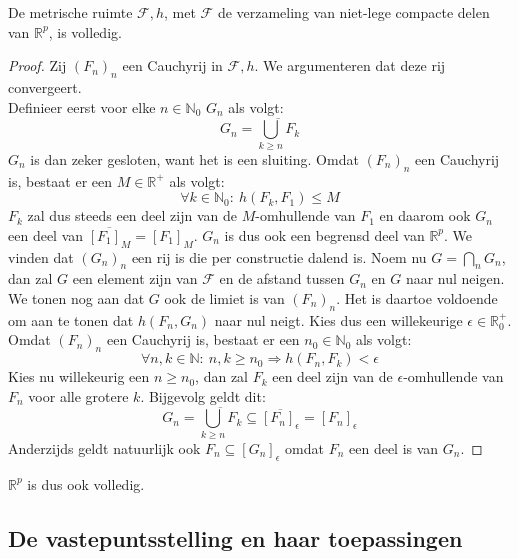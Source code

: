 \documentclass[main.tex]{subfiles}
\begin{document}
\begin{bpr}
  De metrische ruimte $\mathcal{F},h$, met $\mathcal{F}$ de verzameling van niet-lege compacte delen van $\mathbb{R}^{p}$, is volledig.

  \begin{proof}
    Zij $(F_{n})_{n}$ een Cauchyrij in $\mathcal{F},h$.
    We argumenteren dat deze rij convergeert.\\
    Definieer eerst voor elke $n\in\mathbb{N}_{0}$ $G_{n}$ als volgt:
    \[ G_{n} = \overline{\bigcup_{k \ge n}F_{k}} \]
    $G_{n}$ is dan zeker gesloten, want het is een sluiting.
    Omdat $(F_{n})_{n}$ een Cauchyrij is, bestaat er een $M\in\mathbb{R}^{+}$ als volgt:
    \[ \forall k\in \mathbb{N}_{0}:\ h(F_{k},F_{1}) \le M \]
    $F_{k}$ zal dus steeds een deel zijn van de $M$-omhullende van $F_{1}$ en daarom ook $G_{n}$ een deel van $\overline{[F_{1}]_{M}} = [F_{1}]_{M}$.
    $G_{n}$ is dus ook een begrensd deel van $\mathbb{R}^{p}$.
    We vinden dat $(G_{n})_{n}$ een rij is die per constructie dalend is.
    Noem nu $G = \bigcap_{n} G_{n}$, dan zal $G$ een element zijn van $\mathcal{F}$ en de afstand tussen $G_{n}$ en $G$ naar nul neigen.
    We tonen nog aan dat $G$ ook de limiet is van $(F_{n})_{n}$.
    Het is daartoe voldoende om aan te tonen dat $h(F_{n},G_{n})$ naar nul neigt.
    Kies dus een willekeurige $\epsilon \in \mathbb{R}_{0}^{+}$.
    Omdat $(F_{n})_{n}$ een Cauchyrij is, bestaat er een $n_{0}\in\mathbb{N}_{0}$ als volgt:
    \[ \forall n,k \in\mathbb{N}:\ n,k \ge n_{0}\Rightarrow h(F_{n},F_{k}) < \epsilon \]
    Kies nu willekeurig een $n\ge n_{0}$, dan zal $F_{k}$ een deel zijn van de $\epsilon$-omhullende van $F_{n}$ voor alle grotere $k$.
    Bijgevolg geldt dit:
    \[ G_{n} = \overline{\bigcup_{k \ge n}F_{k}} \subseteq \overline{[F_{n}]_{\epsilon}} = [F_{n}]_{\epsilon} \]
    Anderzijds geldt natuurlijk ook $F_{n} \subseteq [G_{n}]_{\epsilon}$ omdat $F_{n}$ een deel is van $G_{n}$.
  \end{proof}
\end{bpr}

\begin{gev}
  $\mathbb{R}^{p}$ is dus ook volledig.
\end{gev}

\subsection{De vastepuntsstelling en haar toepassingen}
\label{sec:vastepuntsstelling}
\end{document}
